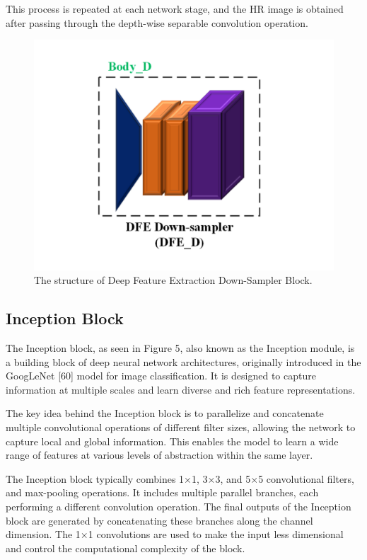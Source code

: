 \documentclass{ieeeaccess}
\begin{document}
This process is repeated at each network stage, and the HR image is obtained after passing through the depth-wise separable convolution operation.

\begin{figure}[ht]
  \includegraphics[width=\linewidth]{4FIGURE.pdf}
  \caption{The structure of Deep Feature Extraction Down-Sampler Block.}
  \label{fig:4}
\end{figure}

\subsection{Inception Block}
The Inception block, as seen in Figure 5, also known as the Inception module, is a building block of deep neural network architectures, originally introduced in the GoogLeNet [60] model for image classification. It is designed to capture information at multiple scales and learn diverse and rich feature representations.

The key idea behind the Inception block is to parallelize and concatenate multiple convolutional operations of different filter sizes, allowing the network to capture local and global information. This enables the model to learn a wide range of features at various levels of abstraction within the same layer.

The Inception block typically combines 1$\times$1, 3$\times$3, and 5$\times$5 convolutional filters, and max-pooling operations. It includes multiple parallel branches, each performing a different convolution operation. The final outputs of the Inception block are generated by concatenating these branches along the channel dimension. The 1$\times$1 convolutions are used to make the input less dimensional and control the computational complexity of the block.
\end{document}

